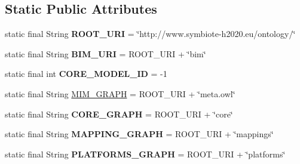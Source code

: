 \subsection*{Static Public Attributes}
\begin{DoxyCompactItemize}
\item 
static final String {\bfseries R\+O\+O\+T\+\_\+\+U\+RI} = \char`\"{}http\+://www.\+symbiote-\/h2020.\+eu/ontology/\char`\"{}\hypertarget{classeu_1_1h2020_1_1symbiote_1_1ontology_1_1model_1_1Ontology_ad4ba69ae7dac12c22d8ef04eb601e58a}{}\label{classeu_1_1h2020_1_1symbiote_1_1ontology_1_1model_1_1Ontology_ad4ba69ae7dac12c22d8ef04eb601e58a}

\item 
static final String {\bfseries B\+I\+M\+\_\+\+U\+RI} = R\+O\+O\+T\+\_\+\+U\+RI + \char`\"{}bim\char`\"{}\hypertarget{classeu_1_1h2020_1_1symbiote_1_1ontology_1_1model_1_1Ontology_a7aaa930fb8161880239a7ac52f216225}{}\label{classeu_1_1h2020_1_1symbiote_1_1ontology_1_1model_1_1Ontology_a7aaa930fb8161880239a7ac52f216225}

\item 
static final int {\bfseries C\+O\+R\+E\+\_\+\+M\+O\+D\+E\+L\+\_\+\+ID} = -\/1\hypertarget{classeu_1_1h2020_1_1symbiote_1_1ontology_1_1model_1_1Ontology_aa5544a19fc902c62fbbab535b9d5fd25}{}\label{classeu_1_1h2020_1_1symbiote_1_1ontology_1_1model_1_1Ontology_aa5544a19fc902c62fbbab535b9d5fd25}

\item 
static final String \hyperlink{classeu_1_1h2020_1_1symbiote_1_1ontology_1_1model_1_1Ontology_abd334d1878740c80789fc2c6a9bf8afe}{M\+I\+M\+\_\+\+G\+R\+A\+PH} = R\+O\+O\+T\+\_\+\+U\+RI + \char`\"{}meta.\+owl\char`\"{}
\item 
static final String {\bfseries C\+O\+R\+E\+\_\+\+G\+R\+A\+PH} = R\+O\+O\+T\+\_\+\+U\+RI + \char`\"{}core\char`\"{}\hypertarget{classeu_1_1h2020_1_1symbiote_1_1ontology_1_1model_1_1Ontology_a9ff8865d9324d4eb0a22a06da407f192}{}\label{classeu_1_1h2020_1_1symbiote_1_1ontology_1_1model_1_1Ontology_a9ff8865d9324d4eb0a22a06da407f192}

\item 
static final String {\bfseries M\+A\+P\+P\+I\+N\+G\+\_\+\+G\+R\+A\+PH} = R\+O\+O\+T\+\_\+\+U\+RI + \char`\"{}mappings\char`\"{}\hypertarget{classeu_1_1h2020_1_1symbiote_1_1ontology_1_1model_1_1Ontology_a6efaea27ffb1a2f126b428b9269bfe4b}{}\label{classeu_1_1h2020_1_1symbiote_1_1ontology_1_1model_1_1Ontology_a6efaea27ffb1a2f126b428b9269bfe4b}

\item 
static final String {\bfseries P\+L\+A\+T\+F\+O\+R\+M\+S\+\_\+\+G\+R\+A\+PH} = R\+O\+O\+T\+\_\+\+U\+RI + \char`\"{}platforms\char`\"{}\hypertarget{classeu_1_1h2020_1_1symbiote_1_1ontology_1_1model_1_1Ontology_a3015fabdd8b80269b6512ac8a5d91a97}{}\label{classeu_1_1h2020_1_1symbiote_1_1ontology_1_1model_1_1Ontology_a3015fabdd8b80269b6512ac8a5d91a97}


\end{DoxyCompactItemize}

